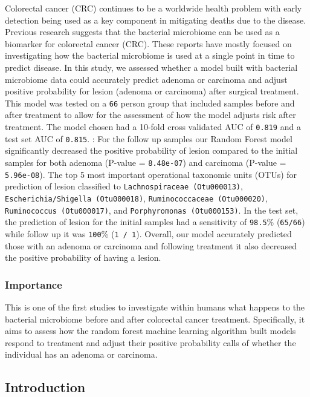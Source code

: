 \documentclass[12pt,]{article}
\begin{document}
Colorectal cancer (CRC) continues to be a worldwide health problem with
early detection being used as a key component in mitigating deaths due
to the disease. Previous research suggests that the bacterial microbiome
can be used as a biomarker for colorectal cancer (CRC). These reports
have mostly focused on investigating how the bacterial microbiome is
used at a single point in time to predict disease. In this study, we
assessed whether a model built with bacterial microbiome data could
accurately predict adenoma or carcinoma and adjust positive probability
for lesion (adenoma or carcinoma) after surgical treatment. This model
was tested on a \texttt{66} person group that included samples before
and after treatment to allow for the assessment of how the model adjusts
risk after treatment. The model chosen had a 10-fold cross validated AUC
of \texttt{0.819} and a test set AUC of \texttt{0.815}. : For the follow
up samples our Random Forest model significantly decreased the positive
probability of lesion compared to the initial samples for both adenoma
(P-value = \texttt{8.48e-07}) and carcinoma (P-value =
\texttt{5.96e-08}). The top 5 most important operational taxonomic units
(OTUs) for prediction of lesion classified to
\texttt{Lachnospiraceae\ (Otu000013)},
\texttt{Escherichia/Shigella\ (Otu000018)},
\texttt{Ruminococcaceae\ (Otu000020)},
\texttt{Ruminococcus\ (Otu000017)}, and
\texttt{Porphyromonas\ (Otu000153)}. In the test set, the prediction of
lesion for the initial samples had a sensitivity of \texttt{98.5}\%
(\texttt{65/66}) while follow up it was \texttt{100}\%
(\texttt{1\ /\ 1}). Overall, our model accurately predicted those with
an adenoma or carcinoma and following treatment it also decreased the
positive probability of having a lesion.

\newpage

\subsubsection{Importance}\label{importance}

This is one of the first studies to investigate within humans what
happens to the bacterial microbiome before and after colorectal cancer
treatment. Specifically, it aims to assess how the random forest machine
learning algorithm built models respond to treatment and adjust their
positive probability calls of whether the individual has an adenoma or
carcinoma.

\newpage

\subsection{Introduction}\label{introduction}
\end{document}
